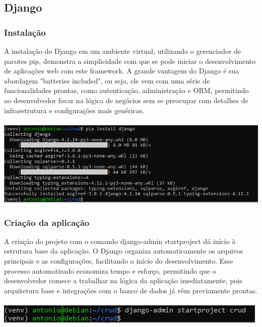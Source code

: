 \documentclass[11pt]{article} %
\begin{document}
\subsection{Django}
\subsubsection{Instalação}
A instalação do Django em um ambiente virtual, utilizando o gerenciador de pacotes pip, demonstra a simplicidade com que se pode iniciar o desenvolvimento de aplicações web com este framework. A grande vantagem do Django é sua abordagem "batteries included", ou seja, ele vem com uma série de funcionalidades prontas, como autenticação, administração e ORM, permitindo ao desenvolvedor focar na lógica de negócios sem se preocupar com detalhes de infraestrutura e configurações mais genéricas. \\\\
\includegraphics[width=150mm,scale=1]{images/s4.PNG}
\subsubsection{Criação da aplicação}
A criação do projeto com o comando django-admin startproject dá início à estrutura base da aplicação. O Django organiza automaticamente os arquivos principais e as configurações, facilitando o início do desenvolvimento. Esse processo automatizado economiza tempo e esforço, permitindo que o desenvolvedor comece a trabalhar na lógica da aplicação imediatamente, pois arquitetura base e integrações com o banco de dados já vêm previamente prontas.\\\\
\includegraphics[]{images/s5.PNG}
\end{document}
